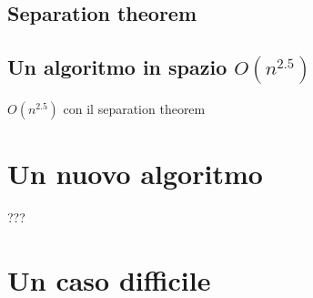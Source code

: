 \documentclass[a4paper,10pt]{amsbook}
\theoremstyle{plain}
\theoremstyle{definition}
\theoremstyle{remark}
\begin{document}
\subsection{Separation theorem}

\subsection{Un algoritmo in spazio $O(n^{2.5})$}

$O(n^{2.5})$ con il separation theorem

\section{Un nuovo algoritmo}

???

\section{Un caso difficile}





\end{document}
